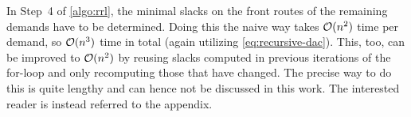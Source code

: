 In Step~4 of \cref{algo:rrl}, the minimal slacks on the front routes of the remaining demands have to be determined.
Doing this the naive way takes $\mathcal{O}(n^2)$ time per demand, so $\mathcal{O}(n^3)$ time in total (again utilizing \cref{eq:recursive-dac}).
This, too, can be improved to $\mathcal{O}(n^2)$ by reusing slacks computed in previous iterations of the for-loop and only recomputing those that have changed.
The precise way to do this is quite lengthy and can hence not be discussed in this work. 
The interested reader is instead referred to the appendix.